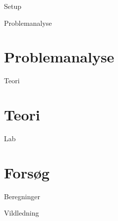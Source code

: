 

\raggedbottom



\frontmatter %


	\begin{folderinput}{Setup}

\cleardoublepage

\cleardoublepage

\tableofcontents*												%

	\end{folderinput}

\mainmatter %

	\begin{folderinput}{Problemanalyse}
\chapter{Problemanalyse}







	\end{folderinput}
	
\begin{folderinput} {Teori}
\chapter{Teori}


\end{folderinput}

	\begin{folderinput}{Lab}
\chapter{Forsøg}


	\end{folderinput}

	\begin{folderinput}{Beregninger}

	\end{folderinput}

	\begin{folderinput}{Vildledning}

	\end{folderinput}
	
	


\appendix
\clearforchapter
{}
{}


%
